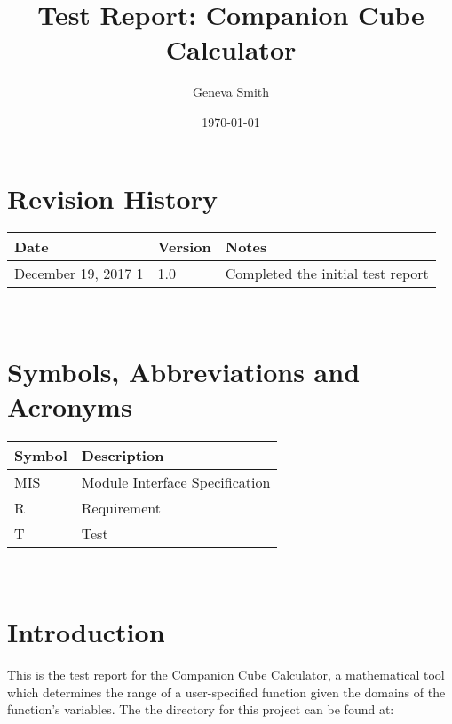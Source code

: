 \documentclass[12pt, titlepage]{article}
\begin{document}
\title{Test Report: Companion Cube Calculator} 
\author{Geneva Smith}
\date{\today}
	
\maketitle


\section{Revision History}

\begin{tabularx}{\textwidth}{p{3cm}p{2cm}X}
\toprule {\bf Date} & {\bf Version} & {\bf Notes}\\
\midrule
December 19, 2017 1 & 1.0 & Completed the initial test report\\
\bottomrule
\end{tabularx}

~\newpage

\section{Symbols, Abbreviations and Acronyms}

\renewcommand{\arraystretch}{1.2}
\begin{tabular}{l l} 
  \toprule		
  \textbf{Symbol} & \textbf{Description}\\
  \midrule 
  MIS & Module Interface Specification \\
  R & Requirement \\
  T & Test\\
  \bottomrule
\end{tabular}\\

\newpage

\tableofcontents

\listoftables %


\newpage


\section{Introduction}
This is the test report for the Companion Cube Calculator, a mathematical 
tool which determines the range of a user-specified function given the domains 
of the function's variables. The the directory for this project can be found at:
\end{document}
